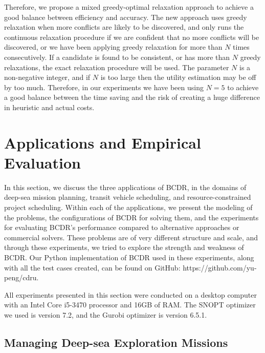 \documentclass[jair,twoside,11pt,theapa]{article}
\begin{document}
Therefore, we propose a mixed greedy-optimal relaxation approach to achieve a
good balance between efficiency and accuracy. The new approach uses greedy
relaxation when more conflicts are likely to be discovered, and only runs the
continuous relaxation procedure if we are confident that no more conflicts will be
discovered, or we have been applying greedy relaxation for more than $N$ times
consecutively. If a candidate is found to be consistent, or has more than $N$
greedy relaxations, the exact relaxation procedure will be used. The parameter
$N$ is a non-negative integer, and if $N$ is too large then the utility
estimation may be off by too much. Therefore, in our experiments we have been
using $N=5$ to achieve a good balance between the time saving and the risk of
creating a huge difference in heuristic and actual costs.



\section{Applications and Empirical Evaluation}


In this section, we discuss the three applications of BCDR, in the domains of
deep-sea mission planning, transit vehicle scheduling, and resource-constrained
project scheduling. Within each of the applications, we present the modeling of
the problems, the configurations of BCDR for solving them, and the experiments
for evaluating BCDR's performance compared to alternative approaches or
commercial solvers. These problems are of very different structure and scale,
and through these experiments, we tried to explore the strength and weakness of
BCDR. Our Python implementation of BCDR used in these experiments, along with
all the test cases created, can be found on GitHub: https://github.com/yu-peng/cdru.


All experiments presented in this section were conducted on a desktop computer
with an Intel Core i5-3470 processor and 16GB of RAM. The SNOPT optimizer we used
is version 7.2, and the Gurobi optimizer is version 6.5.1.


\subsection{Managing Deep-sea Exploration Missions}
\end{document}
